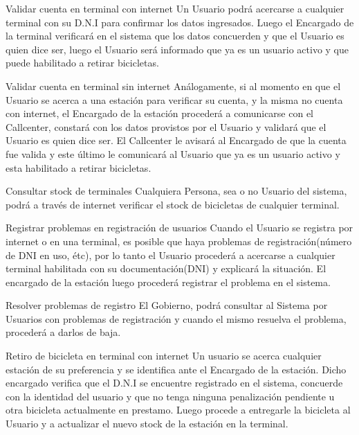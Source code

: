 \begin{subsection}{Validar cuenta en terminal con internet}
Un Usuario podrá acercarse a cualquier terminal con su D.N.I para confirmar los datos ingresados. Luego el Encargado de la terminal verificará en el sistema que los datos concuerden y que el Usuario es quien dice ser, luego el Usuario será informado que ya es un usuario activo y que puede habilitado a retirar bicicletas.
\end{subsection}

\begin{subsection}{Validar cuenta en terminal sin internet}
Análogamente, si al momento en que el Usuario se acerca a una estación para verificar su cuenta, y la misma no cuenta con internet, el Encargado de la estación procederá a comunicarse con el Callcenter, constará con los datos provistos por el Usuario y validará que el Usuario es quien dice ser. El Callcenter le avisará al Encargado de que la cuenta fue valida y este último le comunicará al Usuario que ya es un usuario activo y esta habilitado a retirar bicicletas.
\end{subsection}

\begin{subsection}{Consultar stock de terminales}
Cualquiera Persona, sea o no Usuario del sistema, podrá a través de internet verificar el stock de bicicletas de cualquier terminal.
\end{subsection}

\begin{subsection}{Registrar problemas en registración de usuarios}
Cuando el Usuario se registra por internet o en una terminal, es posible que haya problemas de registración(número de DNI en uso, étc), por lo tanto el Usuario procederá a acercarse a cualquier terminal habilitada con su documentación(DNI) y explicará la situación. El encargado de la estación luego procederá registrar el problema en el sistema.
\end{subsection}

\begin{subsection}{Resolver problemas de registro}
El Gobierno, podrá consultar al Sistema por Usuarios con problemas de registración y cuando el mismo resuelva el problema, procederá a darlos de baja. 
\end{subsection}

\begin{subsection}{Retiro de bicicleta en terminal con internet}
Un usuario se acerca cualquier estación de su preferencia y se identifica ante el Encargado de la estación.
Dicho encargado verifica que el D.N.I se encuentre registrado en el sistema, concuerde con la identidad del usuario y que no tenga ninguna penalización pendiente u otra bicicleta actualmente en prestamo. Luego procede a entregarle la bicicleta al Usuario y a actualizar el nuevo stock de la estación en la terminal.
\end{subsection}


